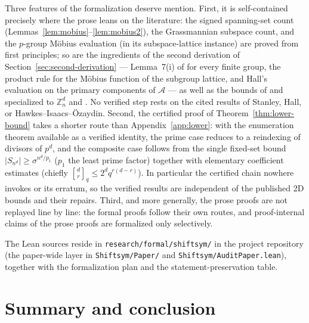 \documentclass[11pt,a4paper]{article}
\theoremstyle{remark}
\newcommand{\ZZ}{\mathbb{Z}}
\newcommand{\A}{\mathcal{A}}
\newcommand{\gaussbinom}[2]{\genfrac{[}{]}{0pt}{}{#1}{#2}}
\begin{document}
Three features of the formalization deserve mention. First, it is
self-contained precisely where the prose leans on the literature: the
signed spanning-set count (Lemmas~\ref{lem:mobius}--\ref{lem:mobius2}), the Grassmannian
subspace count, and the $p$-group M\"obius evaluation (in its
subspace-lattice instance) are proved from first principles; so are the
ingredients of the second derivation of Section~\ref{sec:second-derivation}
--- Lemma~7(i) of \cite{cg2017} for every finite group, the product rule
for the M\"obius function of the subgroup lattice, and Hall's evaluation
on the primary components of $\A$ --- as well as the bounds of
\cite{gjs2016} and \cite{cg2017} specialized to $\ZZ_n^d$ and
\cite[Lemmas~E.21, E.22]{banda2019}. No verified step rests on the cited
results of Stanley, Hall, or Hawkes--Isaacs--\"Ozaydin. Second, the certified proof
of Theorem~\ref{thm:lower-bound} takes a shorter route than
Appendix~\ref{app:lower}: with the enumeration theorem available as a
verified identity, the prime case reduces to a reindexing of divisors of
$p^d$, and the composite case follows from the single fixed-set bound
$|S_{n^d}|\ge\sigma^{n^d/p_1}$ ($p_1$ the least prime factor) together with
elementary coefficient estimates (chiefly $\gaussbinom dr_q\le 2^d
q^{r(d-r)}$). In particular the certified chain nowhere invokes
\cite[Lemma~E.21]{banda2019} or its erratum, so the verified results are
independent of the published 2D bounds and their repairs. Third, and more
generally, the prose proofs are not replayed line by line: the formal
proofs follow their own routes, and proof-internal claims of the prose
proofs are formalized only selectively.

The Lean sources reside in \texttt{research/formal/shiftsym/} in the
project repository (the paper-wide layer in
\texttt{Shiftsym/Paper/} and \texttt{Shiftsym/AuditPaper.lean}), together
with the formalization plan and the
statement-preservation table.

\section{Summary and conclusion}\label{sec:conclusion}
\end{document}
